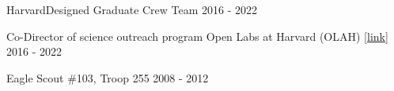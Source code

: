 
\begin{cvhonors}
  \cvlist
    {HarvardDesigned Graduate Crew Team} %
    {2016 - 2022} %
    
  \cvlist
    {Co-Director of science outreach program Open Labs at Harvard (OLAH) \href{https://www.theopenlabs.org/harvard}{[link]}} %
    {2016 - 2022} %
    
  \cvlist
    {Eagle Scout \#103, Troop 255} %
    {2008 - 2012} %
    
\end{cvhonors}